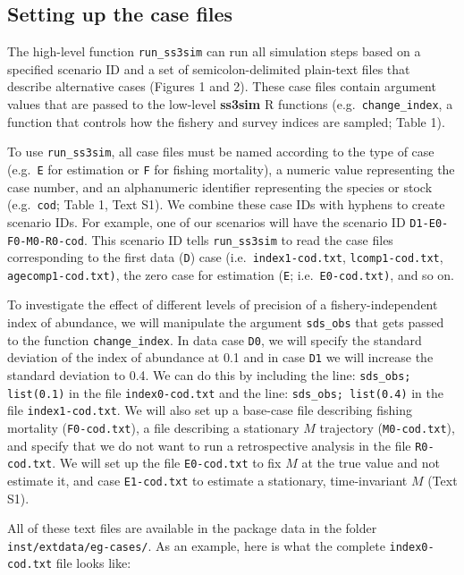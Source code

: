 \documentclass[11pt]{article}
\begin{document}
\begin{spacing}{1.2}
\subsection*{Setting up the case files}

The high-level function \texttt{run\_ss3sim} can run all simulation steps based
on a specified scenario ID and a set of semicolon-delimited plain-text files
that describe alternative cases (Figures 1 and 2). These case files
contain argument values that are passed to the low-level \textbf{ss3sim}
\textsf{R} functions (e.g.~\texttt{change\_index}, a function that controls how
the fishery and survey indices are sampled; Table 1).

To use \texttt{run\_ss3sim}, all case files must be named according to the type
of case (e.g.~\texttt{E} for estimation or \texttt{F} for fishing mortality), a
numeric value representing the case number, and an alphanumeric identifier
representing the species or stock (e.g.~\texttt{cod}; Table 1, Text S1). We
combine these case IDs with hyphens to create scenario IDs. For example, one of
our scenarios will have the scenario ID \texttt{D1-E0-F0-M0-R0-cod}. This
scenario ID tells \texttt{run\_ss3sim} to read the case files corresponding to
the first data (\texttt{D}) case (i.e.~\texttt{index1-cod.txt},
\texttt{lcomp1-cod.txt}, \texttt{agecomp1-cod.txt)}, the zero case for
estimation (\texttt{E}; i.e.~\texttt{E0-cod.txt)}, and so on.

To investigate the effect of different levels of precision of a
fishery-independent index of abundance, we will manipulate the argument
\texttt{sds\_obs} that gets passed to the function \texttt{change\_index}. In
data case \texttt{D0}, we will specify the standard deviation of the index of
abundance at 0.1 and in case \texttt{D1} we will increase the standard
deviation to 0.4. We can do this by including the line: \texttt{sds\_obs;
  list(0.1)} in the file \texttt{index0-cod.txt} and the line:
\texttt{sds\_obs; list(0.4)} in the file \texttt{index1-cod.txt}. We will also
set up a base-case file describing fishing mortality (\texttt{F0-cod.txt}), a
file describing a stationary $M$ trajectory (\texttt{M0-cod.txt}), and specify
that we do not want to run a retrospective analysis in the file
\texttt{R0-cod.txt}. We will set up the file \texttt{E0-cod.txt} to fix $M$ at
the true value and not estimate it, and case \texttt{E1-cod.txt} to estimate a
stationary, time-invariant $M$ (Text S1).

All of these text files are available in the package data in the folder
\texttt{inst/extdata/eg-cases/}. As an example, here is what the complete
\texttt{index0-cod.txt} file looks like:


\end{spacing}
\end{document}

